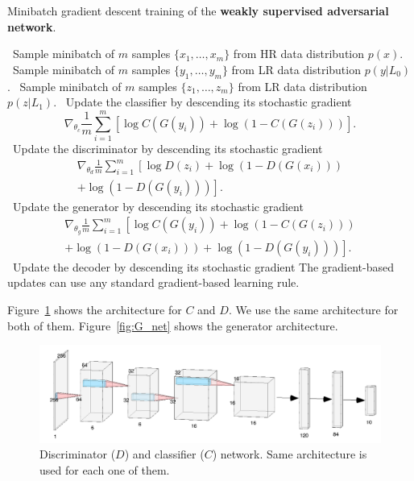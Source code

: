 \documentclass[10pt,twocolumn,letterpaper]{article}
\newcommand{\stateb}{\STATE \textbullet~}
\begin{document}
\begin{algorithm}[h]
    \caption{Minibatch gradient descent training of the \textbf{weakly supervised adversarial network}.}
    \label{alg:srcgan}
    \begin{algorithmic}
    \stateb Sample minibatch of $m$ samples $\{x_1,\ldots, x_m\}$ from HR data distribution $p(x)$.
    \stateb Sample minibatch of $m$ samples $\{y_1,\ldots, y_m\}$ from LR data distribution $p(y|L_0)$.
    \stateb Sample minibatch of $m$ samples $\{z_1,\ldots, z_m\}$ from LR data distribution $p(z|L_1)$.
    \stateb Update the classifier by descending its stochastic gradient
    \[\nabla_{\theta_c} \frac{1}{m} \sum_{i=1}^m \left[\log C(G(y_i)) + \log(1 - C(G(z_i))) \right]. \]
    \stateb Update the discriminator by descending its stochastic gradient
    \[
    \begin{aligned}
    \nabla_{\theta_d} \frac{1}{m} \sum_{i=1}^m \left[\log D(z_i) + \log(1- D(G(x_i))) \right. \\ \left. + \log(1- D(G(y_i))) \right].
    \end{aligned}
    \]
    \stateb Update the generator by descending its stochastic gradient
    \[
    \begin{aligned}
    \nabla_{\theta_{g}} \frac{1}{m} \sum_{i=1}^m \left[\log C(G(y_i)) + \log(1 - C(G(z_i))) \right. \\ \left. + \log(1- D(G(x_i)))+\log(1- D(G(y_i))) \right].
    \end{aligned}
    \]
    \stateb Update the decoder by descending its stochastic gradient
    \ENDFOR
    \STATE The gradient-based updates can use any standard gradient-based learning rule.
    \end{algorithmic}
\end{algorithm}


Figure~\ref{fig:D_net} shows the architecture for $C$ and $D.$ We use the same architecture for both of them. Figure~\ref{fig:G_net} shows the generator architecture.

\begin{figure}[h]
\begin{center}
\includegraphics[scale=0.35]{D_net.png}
\end{center}
   \caption{Discriminator ($D$) and classifier ($C$) network. Same architecture is used for each one of them.}
\label{fig:D_net}
\end{figure}
\end{document}
